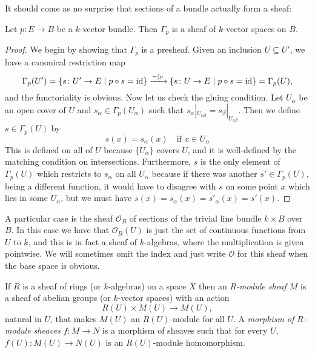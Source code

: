 \documentclass[a4paper,openany]{scrbook}
\begin{document}
It should come as no surprise that sections of a bundle actually form a sheaf:

\begin{prop}
Let $p\colon E \to B$ be a $k$-vector bundle. Then $\Gamma_p$ is a sheaf of $k$-vector spaces on $B$.
\end{prop}
\begin{proof}
We begin by showing that $\Gamma_p$ is a presheaf. Given an inclusion $U \subseteq U'$, we have a canonical restriction map
\[
\Gamma_p(U') = \{s \colon U' \to E \mid p \circ s = \operatorname{id}\} \xrightarrow{-|_U} \{s \colon U \to E \mid p \circ s = \operatorname{id}\} = \Gamma_p(U),
\]
and the functoriality is obvious. Now let us check the gluing condition. Let $U_\alpha$ be an open cover of $U$ and $s_\alpha \in \Gamma_p(U_\alpha)$ such that $s_\alpha|_{U_{\alpha\beta}} = s_\beta|_{U_{\alpha\beta}}$. Then we define $s \in \Gamma_p(U)$ by
\[
s(x) = s_\alpha(x) \quad \text{if } x \in U_\alpha
\]
This is defined on all of $U$ because $\{U_\alpha\}$ covers $U$, and it is well-defined by the matching condition on intersections. Furthermore, $s$ is the only element of $\Gamma_p(U)$ which restricts to $s_\alpha$ on all $U_\alpha$ because if there was another $s' \in \Gamma_p(U)$, being a different function, it would have to disagree with $s$ on some point $x$ which lies in some $U_\alpha$, but we must have $s(x) = s_\alpha(x) = s'_\alpha(x) = s'(x)$.
\end{proof}

\begin{example}
A particular case is the sheaf $\mathcal O_B$ of sections of the trivial line bundle $k \times B$ over $B$. In this case we have that $\mathcal O_B(U)$ is just the set of continuous functions from $U$ to $k$, and this is in fact a sheaf of $k$-algebras, where the multiplication is given pointwise. We will sometimes omit the index and just write $\mathcal O$ for this sheaf when the base space is obvious.
\end{example}

If $R$ is a sheaf of rings (or $k$-algebras) on a space $X$ then an \emph{$R$-module sheaf $M$} is a sheaf of abelian groups (or $k$-vector spaces) with an action
\[
R(U) \times M(U) \to M(U),
\]
natural in $U$, that makes $M(U)$ an $R(U)$-module for all $U$. A \emph{morphism of $R$-module sheaves} $f\colon M \to N$ is a morphism of sheaves such that for every $U$, $f(U)\colon M(U) \to N(U)$ is an $R(U)$-module homomorphism.
\end{document}
